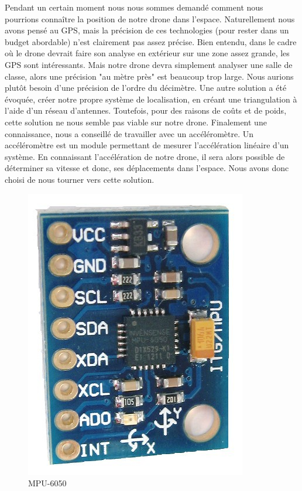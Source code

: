 \documentclass[a4paper,10pt]{report}
\begin{document}
	Pendant un certain moment nous nous sommes demandé comment nous pourrions connaître la position de notre drone dans l'espace. 
	Naturellement nous avons pensé au GPS, mais la précision de ces technologies (pour rester dans un budget abordable) n'est clairement 
	pas assez précise. Bien entendu, dans le cadre où le drone devrait faire son analyse en extérieur sur une zone assez grande, les 
	GPS sont intéressants. Mais notre drone devra simplement analyser une salle de classe, alors une précision "au mètre près" est 
	beaucoup trop large. Nous aurions plutôt besoin d'une précision de l’ordre du décimètre.  Une autre solution a été évoquée, créer 
	notre propre système de localisation, en créant une triangulation à l’aide d’un réseau d’antennes. Toutefois, pour des raisons de 
	coûts et de poids,  cette solution ne nous semble pas viable sur notre drone. Finalement une connaissance, nous a conseillé de 
	travailler avec un accéléromètre. Un accéléromètre est un module permettant de mesurer l'accélération linéaire d’un système. 
	En connaissant l'accélération de notre drone, il sera alors possible de déterminer sa vitesse et donc, ses déplacements dans 
	l’espace. Nous avons donc choisi de nous tourner vers cette solution.
	
	\begin{figure}[htbp]%
	  \centering
	  \includegraphics[scale = 0.2]{img/mpu-6050.jpg}
	  \caption{MPU-6050}
	  \label{mpu6050}
	\end{figure}	
      
\end{document}
